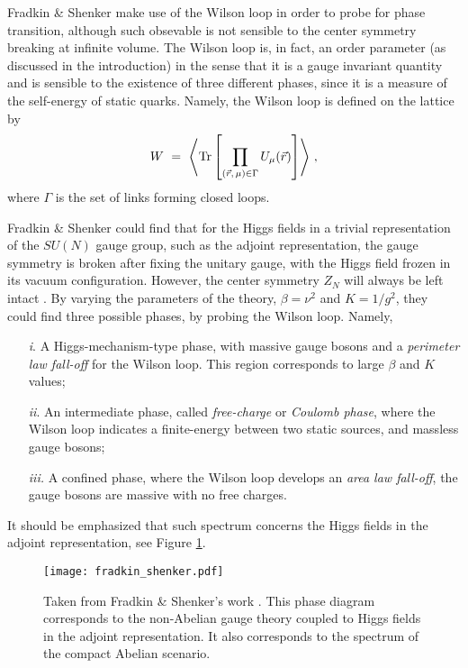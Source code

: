 Fradkin \& Shenker make use of the Wilson loop in order to probe for phase transition,
although such obsevable is not sensible to the center symmetry breaking at infinite volume. The
Wilson loop is, in fact, an order parameter (as discussed in the introduction) in the sense
that it is a gauge invariant quantity and is sensible to the existence of three different
phases, since it is a measure of the self-energy of static quarks. Namely, the Wilson loop is
defined on the lattice by
\begin{eqnarray}
W ~=~ \left\langle \mathrm{Tr} \left[ \prod_{(\vec{r},\,\mu)\in\Gamma} U_{\mu}(\vec{r}) \right]
\right\rangle\,,
\end{eqnarray}
where $\Gamma$ is the set of links forming closed loops.

Fradkin \& Shenker could find that for the Higgs fields in a trivial representation of the
$SU(N)$ gauge group, such as the adjoint representation, the gauge symmetry is broken
after fixing the unitary gauge, with the Higgs field frozen in its vacuum configuration.
However, the center symmetry $Z_{N}$ will always be left intact \cite{Fradkin:1978dv}. By
varying the parameters of the theory, $\beta=\nu^{2}$ and $K=1/g^{2}$, they could find three possible phases,
by probing the Wilson loop. Namely,
\begin{itemize}
\item[\emph{i}.] A Higgs-mechanism-type phase, with massive gauge bosons and a \emph{perimeter
law fall-off} for the Wilson loop. This region corresponds to large $\beta$ and $K$ values;

\item[\emph{ii}.] An intermediate phase, called \emph{free-charge} or \emph{Coulomb phase},
where the Wilson loop indicates a finite-energy between two static sources, and massless gauge
bosons;

\item[\emph{iii.}] A confined phase, where the Wilson loop develops an \emph{area law
fall-off}, the gauge bosons are massive with no free charges.
\end{itemize}
It should be emphasized that such spectrum concerns the Higgs fields in the adjoint
representation, see Figure \ref{fig1}.

\begin{figure}
\begin{center}
\texttt{[image: fradkin\_shenker.pdf]}
\caption{Taken from Fradkin \& Shenker's work \cite{Fradkin:1978dv}. This phase diagram
corresponds to the non-Abelian gauge theory coupled to Higgs fields in the adjoint
representation. It also corresponds to the spectrum of the compact Abelian scenario.}
\label{fig1}
\end{center}
\end{figure}

